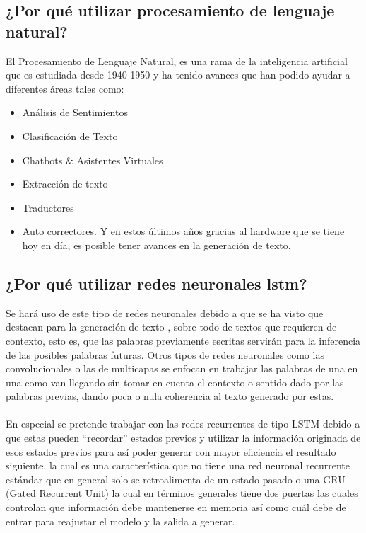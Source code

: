 \documentclass[12pt, a4paper, titlepage]{report}
\begin{document}
	   	 \subsection{¿Por qué utilizar procesamiento de lenguaje natural?}
	   	 El Procesamiento de Lenguaje Natural, es una rama de la inteligencia artificial que es estudiada desde 1940-1950\cite{HistoriaNPL} y ha tenido avances que han podido ayudar a diferentes áreas tales como:
	   	 \begin{itemize}
	   	 	\item Análisis de Sentimientos
	   	 	\item Clasificación de Texto
	   	 	\item Chatbots \& Asistentes Virtuales
	   	 	\item Extracción de texto
	   	 	\item Traductores
	   	 	\item Auto correctores.
	   	 	Y en estos últimos años gracias al hardware que se tiene hoy en día, es posible tener avances en la generación de texto.
	   	 \end{itemize}
   	 
	   	 \subsection{¿Por qué utilizar redes neuronales \acrfull{lstm}?}
	   	 Se hará uso de este tipo de redes neuronales debido a que se ha visto que destacan para la generación de texto \cite{top_ten_lyric}, sobre todo de textos que requieren de contexto, esto es, que las palabras previamente escritas servirán para la inferencia de las posibles palabras futuras. Otros tipos de redes neuronales como las convolucionales o las de multicapas se enfocan en trabajar las palabras de una en una como van llegando sin tomar en cuenta el contexto o sentido dado por las palabras previas, dando poca o nula coherencia al texto generado por estas.\\\\
	   	 En especial se pretende trabajar con las redes recurrentes de tipo LSTM debido a que estas pueden “recordar” estados previos y utilizar la información originada de esos estados previos para así poder generar con mayor eficiencia el resultado siguiente, la cual es una característica que no tiene una red neuronal recurrente estándar que en general solo se retroalimenta de un estado pasado o una GRU (Gated Recurrent Unit) la cual en términos generales tiene dos puertas las cuales controlan que información debe mantenerse en memoria así como cuál debe de entrar para reajustar el modelo y la salida a generar.	
	   	 		
\end{document}
